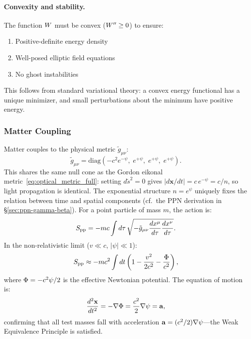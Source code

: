 \paragraph{Convexity and stability.}
The function $W$ must be convex ($W'' \geq 0$) to ensure:
\begin{enumerate}
\item Positive-definite energy density
\item Well-posed elliptic field equations
\item No ghost instabilities
\end{enumerate}
This follows from standard variational theory: a convex energy functional 
has a unique minimizer, and small perturbations about the minimum have 
positive energy.

\subsubsection{Matter Coupling}

Matter couples to the physical metric $\tilde{g}_{\mu\nu}$:
\begin{equation}\label{eq:physical-metric}
\tilde{g}_{\mu\nu} = \text{diag}\!\left(-c^2 e^{-\psi},\; e^{+\psi},\; e^{+\psi},\; e^{+\psi}\right).
\end{equation}
This shares the same null cone as the Gordon eikonal 
metric~\eqref{eq:optical_metric_full}: setting $d\tilde{s}^2 = 0$ gives 
$|d\mathbf{x}/dt| = c\,e^{-\psi} = c/n$, so light propagation is 
identical. The exponential structure $n = e^\psi$ uniquely fixes the 
relation between time and spatial components (cf.\ the PPN 
derivation in \S\ref{sec:ppn-gamma-beta}).
For a point particle of mass $m$, the action is:
\begin{equation}
S_{\rm pp} = -mc \int d\tau\,\sqrt{-\tilde{g}_{\mu\nu}\frac{dx^\mu}{d\tau}\frac{dx^\nu}{d\tau}}.
\end{equation}
In the non-relativistic limit ($v \ll c$, $|\psi| \ll 1$):
\begin{equation}
S_{\rm pp} \approx -mc^2 \int dt\left(1 - \frac{v^2}{2c^2} - \frac{\Phi}{c^2}\right),
\label{eq:pp_action}
\end{equation}
where $\Phi = -c^2\psi/2$ is the effective Newtonian potential. 
The equation of motion is:
\begin{equation}
\frac{d^2\mathbf{x}}{dt^2} = -\nabla\Phi = \frac{c^2}{2}\nabla\psi = \mathbf{a},
\end{equation}
confirming that all test masses fall with acceleration 
$\mathbf{a} = (c^2/2)\nabla\psi$---the Weak Equivalence Principle is satisfied.

